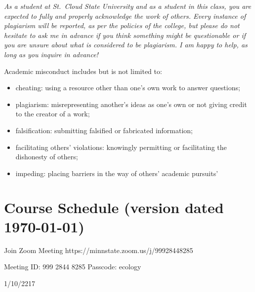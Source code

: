 \documentclass{tufte-handout}
\begin{document}
\begin{fullwidth}


\emph{As a student at St.\ Cloud State University and as a student in this class, you are expected to fully and properly acknowledge the work of others. Every instance of plagiarism will be reported, as per the policies of the college, but please do not hesitate to ask me in advance if you think something might be questionable or if you are unsure about what is considered to be plagiarism. I am happy to help, as long as you inquire in advance! }

Academic misconduct includes but is not limited to:

\begin{itemize}
	\item cheating: using a resource other than one's own work to answer questions;
	\item plagiarism: misrepresenting another's ideas as one's own or not giving credit to the creator of a work;
	\item falsification: submitting falsified or fabricated information;
	\item facilitating others' violations: knowingly permitting or facilitating the dishonesty of others;
	\item impeding: placing barriers in the way of others' academic pursuits'
\end{itemize}







\newpage

\section{Course Schedule (version dated \today)}

Join Zoom Meeting
https://minnstate.zoom.us/j/99928448285

Meeting ID: 999 2844 8285
Passcode: ecology


  \setlength{\calwidth}{6.5in}
  \setlength{\calboxdepth}{0.3in}
  \begin{calendar}{1/10/22}{17}


\end{calendar}
\end{fullwidth}
\end{document}
